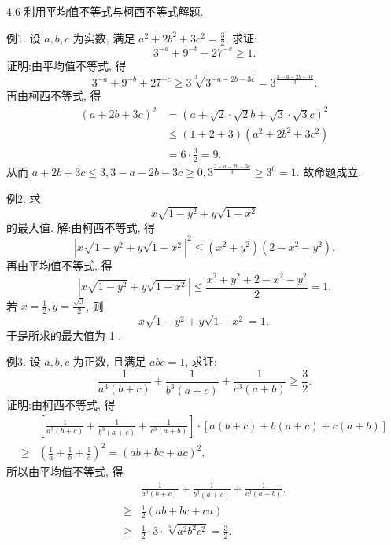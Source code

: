 
4.6 利用平均值不等式与柯西不等式解题.



例1. 设 $a, b, c$ 为实数, 满足 $a^2+2 b^2+3 c^2=\frac{3}{2}$, 求证:
$$
3^{-a}+9^{-b}+27^{-c} \geqslant 1 .
$$
证明:由平均值不等式, 得
$$
3^{-a}+9^{-b}+27^{-c} \geqslant 3 \sqrt[3]{3^{-a-2 b-3 c}}=3^{\frac{3-a-2 b-3 c}{3}} .
$$
再由柯西不等式, 得
$$
\begin{aligned}
(a+2 b+3 c)^2 & =(a+\sqrt{2} \cdot \sqrt{2} b+\sqrt{3} \cdot \sqrt{3} c)^2 \\
& \leqslant(1+2+3)\left(a^2+2 b^2+3 c^2\right) \\
& =6 \cdot \frac{3}{2}=9 .
\end{aligned}
$$
从而 $a+2 b+3 c \leqslant 3,3-a-2 b-3 c \geqslant 0,3^{\frac{3-a-2 b-3 c}{3}} \geqslant 3^0=1$. 故命题成立.



例2. 求
$$
x \sqrt{1-y^2}+y \sqrt{1-x^2}
$$
的最大值.
解:由柯西不等式, 得
$$
\left|x \sqrt{1-y^2}+y \sqrt{1-x^2}\right|^2 \leqslant\left(x^2+y^2\right)\left(2-x^2-y^2\right) .
$$
再由平均值不等式, 得
$$
\left|x \sqrt{1-y^2}+y \sqrt{1-x^2}\right| \leqslant \frac{x^2+y^2+2-x^2-y^2}{2}=1 .
$$
若 $x=\frac{1}{2}, y=\frac{\sqrt{3}}{2}$, 则
$$
x \sqrt{1-y^2}+y \sqrt{1-x^2}=1,
$$
于是所求的最大值为 1 .



例3. 设 $a, b, c$ 为正数, 且满足 $a b c=1$, 求证:
$$
\frac{1}{a^3(b+c)}+\frac{1}{b^3(a+c)}+\frac{1}{c^3(a+b)} \geqslant \frac{3}{2} .
$$
证明:由柯西不等式, 得
$$
\begin{aligned}
& {\left[\frac{1}{a^3(b+c)}+\frac{1}{b^3(a+c)}+\frac{1}{c^3(a+b)}\right] \cdot[a(b+c)+b(a+c)+c(a+b)] } \\
\geqslant & \left(\frac{1}{a}+\frac{1}{b}+\frac{1}{c}\right)^2=(a b+b c+a c)^2,
\end{aligned}
$$
所以由平均值不等式, 得
$$
\begin{aligned}
& \frac{1}{a^3(b+c)}+\frac{1}{b^3(a+c)}+\frac{1}{c^3(a+b)} . \\
\geqslant & \frac{1}{2}(a b+b c+c a) \\
\geqslant & \frac{1}{2} \cdot 3 \cdot \sqrt[3]{a^2 b^2 c^2}=\frac{3}{2} .
\end{aligned}
$$



